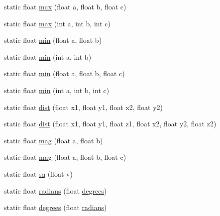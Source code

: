 \begin{DoxyCompactItemize}
static float \hyperlink{classit_1_1sephiroth_1_1android_1_1library_1_1util_1_1_math_utils_ae821ae4efb4112feafaa5fdffdf3f3db}{max} (float a, float b, float c)
\item 
static float \hyperlink{classit_1_1sephiroth_1_1android_1_1library_1_1util_1_1_math_utils_a586637ca0c49f1b1dbd0b10afea0d622}{max} (int a, int b, int c)
\item 
static float \hyperlink{classit_1_1sephiroth_1_1android_1_1library_1_1util_1_1_math_utils_abba40e3b5fe2a073ea65a3cb2504c052}{min} (float a, float b)
\item 
static float \hyperlink{classit_1_1sephiroth_1_1android_1_1library_1_1util_1_1_math_utils_adb4a8ec0c4885429885f5a260df29540}{min} (int a, int b)
\item 
static float \hyperlink{classit_1_1sephiroth_1_1android_1_1library_1_1util_1_1_math_utils_a55f33a0a7a938163055ec492780c6349}{min} (float a, float b, float c)
\item 
static float \hyperlink{classit_1_1sephiroth_1_1android_1_1library_1_1util_1_1_math_utils_a7744d53a1277f22861be6ff1e32fe08b}{min} (int a, int b, int c)
\item 
static float \hyperlink{classit_1_1sephiroth_1_1android_1_1library_1_1util_1_1_math_utils_ade73466dd1270f0fddd9f04dac5d25b6}{dist} (float x1, float y1, float x2, float y2)
\item 
static float \hyperlink{classit_1_1sephiroth_1_1android_1_1library_1_1util_1_1_math_utils_afac72543a22ea9bea81a08f3f0920fdf}{dist} (float x1, float y1, float z1, float x2, float y2, float z2)
\item 
static float \hyperlink{classit_1_1sephiroth_1_1android_1_1library_1_1util_1_1_math_utils_a00d6d0e9711221b03fc87bced7b1e24a}{mag} (float a, float b)
\item 
static float \hyperlink{classit_1_1sephiroth_1_1android_1_1library_1_1util_1_1_math_utils_a6c9f2e8765d2cc78c70544d583a50f38}{mag} (float a, float b, float c)
\item 
static float \hyperlink{classit_1_1sephiroth_1_1android_1_1library_1_1util_1_1_math_utils_aeffc08a00fba472fad830103dc98a0bb}{sq} (float v)
\item 
static float \hyperlink{classit_1_1sephiroth_1_1android_1_1library_1_1util_1_1_math_utils_ac53e717aaa4e0bd7774a41cff6c09f08}{radians} (float \hyperlink{classit_1_1sephiroth_1_1android_1_1library_1_1util_1_1_math_utils_a184aed9c5c0ba2ba75d06522d7132877}{degrees})
\item 
static float \hyperlink{classit_1_1sephiroth_1_1android_1_1library_1_1util_1_1_math_utils_a184aed9c5c0ba2ba75d06522d7132877}{degrees} (float \hyperlink{classit_1_1sephiroth_1_1android_1_1library_1_1util_1_1_math_utils_ac53e717aaa4e0bd7774a41cff6c09f08}{radians})

\end{DoxyCompactItemize}
